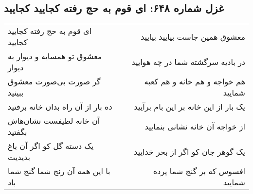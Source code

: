 \begin{center}
\section*{غزل شماره ۶۴۸: ای قوم به حج رفته کجایید کجایید}
\label{sec:0648}
\begin{longtable}{l p{0.5cm} r}
ای قوم به حج رفته کجایید کجایید
&&
معشوق همین جاست بیایید بیایید
\\
معشوق تو همسایه و دیوار به دیوار
&&
در بادیه سرگشته شما در چه هوایید
\\
گر صورت بی‌صورت معشوق ببینید
&&
هم خواجه و هم خانه و هم کعبه شمایید
\\
ده بار از آن راه بدان خانه برفتید
&&
یک بار از این خانه بر این بام برآیید
\\
آن خانه لطیفست نشان‌هاش بگفتید
&&
از خواجه آن خانه نشانی بنمایید
\\
یک دسته گل کو اگر آن باغ بدیدیت
&&
یک گوهر جان کو اگر از بحر خدایید
\\
با این همه آن رنج شما گنج شما باد
&&
افسوس که بر گنج شما پرده شمایید
\\
\end{longtable}
\end{center}
